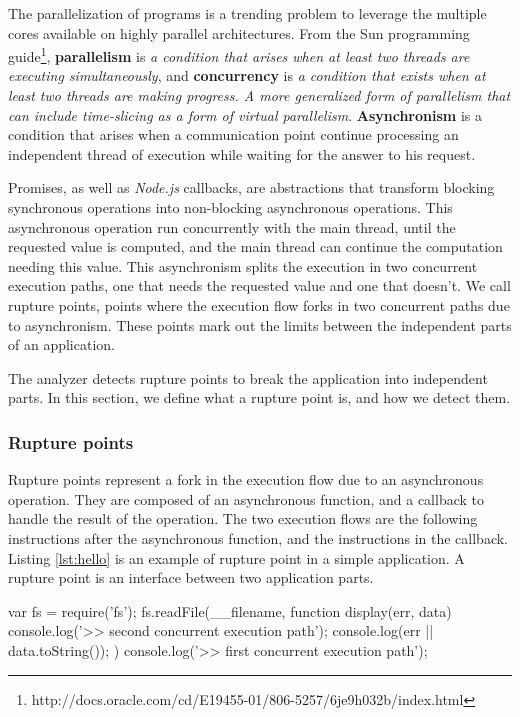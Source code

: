 The parallelization of programs is a trending problem to leverage the multiple cores available on highly parallel architectures.
From the Sun programming guide\footnote{\raggedright http://docs.oracle.com/cd/E19455-01/806-5257/6je9h032b/index.html}, \textbf{parallelism} is \textit{a condition that arises when at least two threads are executing simultaneously}, and \textbf{concurrency} is \textit{a condition that exists when at least two threads are making progress. A more generalized form of parallelism that can include time-slicing as a form of virtual parallelism}.
\textbf{Asynchronism} is a condition that arises when a communication point continue processing an independent thread of execution while waiting for the answer to his request.

Promises\cite{Liskov1988}, as well as \textit{Node.js} callbacks, are abstractions that transform blocking synchronous operations into non-blocking asynchronous operations.
This asynchronous operation run concurrently with the main thread, until the requested value is computed, and the main thread can continue the computation needing this value.
This asynchronism splits the execution in two concurrent execution paths, one that needs the requested value and one that doesn't.
We call rupture points, points where the execution flow forks in two concurrent paths due to asynchronism.
These points mark out the limits between the independent parts of an application.
 
The analyzer detects rupture points to break the application into independent parts.
In this section, we define what a rupture point is, and how we detect them.

\subsubsection{Rupture points}

Rupture points represent a fork in the execution flow due to an asynchronous operation.
They are composed of an asynchronous function, and a callback to handle the result of the operation.
The two execution flows are the following instructions after the asynchronous function, and the instructions in the callback.
Listing \ref{lst:hello} is an example of rupture point in a simple application.
A rupture point is an interface between two application parts.

\begin{code}[Javascript, caption={Example of a rupture point : an asynchronous function call, \texttt{fs.readFile()}, with a callback parameter, \texttt{function display}},label={lst:hello}]
var fs = require('fs');
fs.readFile(__filename, function display(err, data) {
  console.log('>> second concurrent execution path');
  console.log(err || data.toString());
})
console.log('>> first concurrent execution path');
\end{code}

